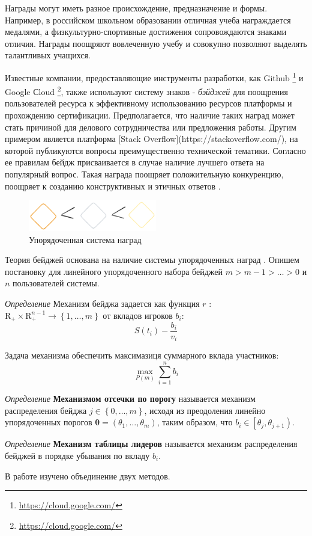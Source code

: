 Награды могут иметь разное происхождение, предназначение и формы. 
Например, в российском школьном образовании отличная учеба награждается медалями, а физкультурно-спортивные достижения сопровождаются знаками отличия.
Награды поощряют вовлеченную учебу и совокупно позволяют выделять талантливых учащихся. 

Известные компании, предоставляющие инструменты разработки, как Github \footnote{\url{https://cloud.google.com/}}
и Google Сloud \footnote{\url{https://cloud.google.com/}}, также используют систему знаков - \textit{бэйджей} 
для поощрения пользователей ресурса к эффективному использованию ресурсов платформы и прохождению сертификации. 
Предполагается, что наличие таких наград может стать причиной для делового сотрудничества или предложения работы. Другим примером является платформа [Stack Overflow](https://stackoverflow.com/),
на которой публикуются вопросы преимущественно технической тематики.
Согласно ее правилам бейдж присваивается в случае наличие лучшего ответа на популярный вопрос.
Такая награда поощряет положительную конкуренцию, поощряет к созданию конструктивных и этичных ответов \cite{yanovsky2021one}.
\begin{figure}[h]
    \centering
    \includegraphics[width=0.5\textwidth]{assets/pedagogic/social/badge.excalidraw.png}
    \caption{Упорядоченная система наград}
    \label{badge}
\end{figure}


Теория бейджей основана на наличие системы упорядоченных наград \cite{Easley2013}. Опишем постановку для линейного
упорядоченного набора бейджей $m > m-1 > \dots > 0$ и $n$  пользователей системы.

\textit{Определение} Механизм бейджа задается как функция $r$ : $\mathrm{R}_{+} \times \mathrm{R}_{+}^{n-1} \rightarrow \left\{1, \dots,m \right\}$ 
от вкладов игроков $b_i$:
\begin{equation}
    S(t_i) - \frac{b_i}{v_i}
\end{equation}

Задача механизма обеспечить максимазиця суммарного вклада участников:
\begin{equation}
    \max_{P(m)} \sum_{i=1}^n b_i
\end{equation}

\textit{Определение} \textbf{Механизмом отсечки по порогу} называется механизм распределения бейджа $j \in \left\{0,\dots,m\right\}$, исходя
из преодоления линейно упорядоченных порогов $\mathbf{\theta} =(\theta_1,\dots,\theta_m)$, таким образом, что $b_i \in \left[\theta_j,\theta_{j+1}\right)$.

\textit{Определение} \textbf{Механизм таблицы лидеров} называется механизм распределения бейджей в порядке убывания по вкладу $b_i$.


В работе \cite{Easley2013} изучено объединение двух методов.



